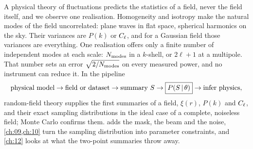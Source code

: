 A physical theory of fluctuations predicts the statistics of a field, never the field itself,
and we observe one realisation. Homogeneity and isotropy make the natural modes of the field
uncorrelated: plane waves in flat space, spherical harmonics on the sky. Their variances are
$P(k)$ or $C_\ell$, and for a Gaussian field those variances are everything. One realisation offers
only a finite number of independent modes at each scale: $N_{\rm modes}$ in a $k$-shell, or
$2\ell+1$ at a multipole. That number sets an error $\sqrt{2/N_{\rm modes}}$ on every measured
power, and no instrument can reduce it. In the pipeline
\[
  \text{physical model}\to\text{field or dataset}\to\text{summary }S\to
  \boxed{P(S\,\vert\,\theta)}\to\text{infer physics},
\]
random-field theory supplies the first summaries of a field, $\xi(r)$, $P(k)$ and $C_\ell$, and their exact
sampling distributions in the ideal case of a complete, noiseless field; Monte Carlo confirms them.
 adds the mask, the beam and the noise, \cref{ch:09,ch:10} turn the sampling
distribution into parameter constraints, and \cref{ch:12} looks at what the two-point summaries
throw away.

